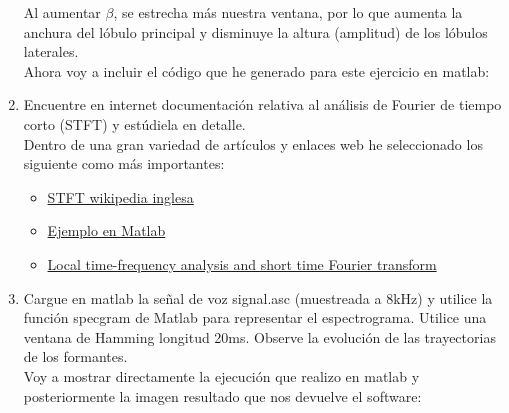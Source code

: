 \documentclass[a4paper,12pt]{article}
\begin{document}
\begin{enumerate}
Al aumentar $\beta$, se estrecha más nuestra ventana, por lo que aumenta la anchura del lóbulo principal y disminuye la altura (amplitud) de los lóbulos laterales. \\

Ahora voy a incluir el código que he generado para este ejercicio en matlab: \\



\item Encuentre en internet documentación relativa al análisis de Fourier de tiempo corto (STFT) y
estúdiela en detalle. \\

Dentro de una gran variedad de artículos y enlaces web he seleccionado los siguiente como más importantes:
\begin{itemize}
\item \href{http://en.wikipedia.org/wiki/Short-time_Fourier_transform}{STFT wikipedia inglesa}
\item \href{http://www.mathworks.com/matlabcentral/fileexchange/38773-short-time-fourier-transform}{Ejemplo en Matlab} 
\item \href{https://www.math.ucdavis.edu/~strohmer/research/gabor/gaborintro/node3.html}{Local time-frequency analysis and short time Fourier transform}
\end{itemize}

\item Cargue en matlab la señal de voz signal.asc (muestreada a 8kHz) y utilice la función specgram de Matlab para representar el espectrograma. Utilice una ventana de Hamming longitud 20ms. Observe la evolución de las trayectorias de los formantes. \\

Voy a mostrar directamente la ejecución que realizo en matlab y posteriormente la imagen resultado que nos devuelve el software: \\




\end{enumerate}
\end{document}
